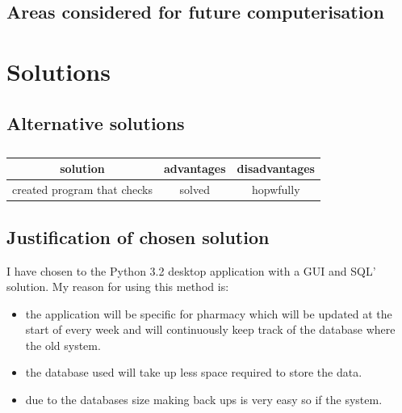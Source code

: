\subsection{Areas considered for future computerisation}

\pagebreak
\section{Solutions}
\subsection{Alternative solutions}

\begin{table}[h]
\begin{tabular}{|c|c|c|}
\hline
solution & advantages & disadvantages\\
\hline
created program that checks  & solved & hopwfully\\
\hline
\end{tabular}
\caption{}
\label{tab:nonlin}
\end{table}

\subsection{Justification of chosen solution}
I have chosen to the Python 3.2 desktop application with a GUI and SQL' solution. My reason for using this method is:
\begin{itemize}
    \item the application will be specific for pharmacy which will be updated at the start of every week and will continuously keep track of the database where the old system.
    \item the database used will take up less space required to store the data.
    \item due to the databases size making back ups is very easy so if the system.
\end{itemize} 
